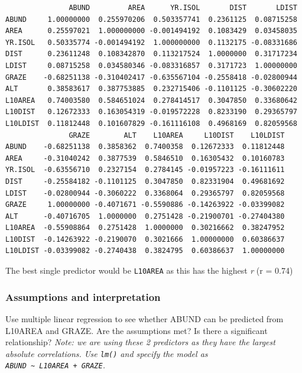 \documentclass[
  10pt,
  letterpaper,
  DIV=11,
  numbers=noendperiod]{scrartcl}
\begin{document}
\begin{verbatim}
               ABUND         AREA      YR.ISOL       DIST       LDIST
ABUND     1.00000000  0.255970206  0.503357741  0.2361125  0.08715258
AREA      0.25597021  1.000000000 -0.001494192  0.1083429  0.03458035
YR.ISOL   0.50335774 -0.001494192  1.000000000  0.1132175 -0.08331686
DIST      0.23611248  0.108342870  0.113217524  1.0000000  0.31717234
LDIST     0.08715258  0.034580346 -0.083316857  0.3171723  1.00000000
GRAZE    -0.68251138 -0.310402417 -0.635567104 -0.2558418 -0.02800944
ALT       0.38583617  0.387753885  0.232715406 -0.1101125 -0.30602220
L10AREA   0.74003580  0.584651024  0.278414517  0.3047850  0.33680642
L10DIST   0.12672333  0.163054319 -0.019572228  0.8233190  0.29365797
L10LDIST  0.11812448  0.101607829 -0.161116108  0.4968169  0.82059568
               GRAZE        ALT    L10AREA     L10DIST    L10LDIST
ABUND    -0.68251138  0.3858362  0.7400358  0.12672333  0.11812448
AREA     -0.31040242  0.3877539  0.5846510  0.16305432  0.10160783
YR.ISOL  -0.63556710  0.2327154  0.2784145 -0.01957223 -0.16111611
DIST     -0.25584182 -0.1101125  0.3047850  0.82331904  0.49681692
LDIST    -0.02800944 -0.3060222  0.3368064  0.29365797  0.82059568
GRAZE     1.00000000 -0.4071671 -0.5590886 -0.14263922 -0.03399082
ALT      -0.40716705  1.0000000  0.2751428 -0.21900701 -0.27404380
L10AREA  -0.55908864  0.2751428  1.0000000  0.30216662  0.38247952
L10DIST  -0.14263922 -0.2190070  0.3021666  1.00000000  0.60386637
L10LDIST -0.03399082 -0.2740438  0.3824795  0.60386637  1.00000000
\end{verbatim}

The best single predictor would be \texttt{L10AREA} as this has the
highest \emph{r} (r = 0.74)

\hypertarget{assumptions-and-interpretation}{%
\subsubsection{Assumptions and
interpretation}\label{assumptions-and-interpretation}}

\begin{tcolorbox}[enhanced jigsaw, rightrule=.15mm, coltitle=black, leftrule=.75mm, titlerule=0mm, breakable, toprule=.15mm, bottomtitle=1mm, colback=white, toptitle=1mm, opacitybacktitle=0.6, bottomrule=.15mm, arc=.35mm, left=2mm, title=\textcolor{quarto-callout-warning-color}{\faExclamationTriangle}\hspace{0.5em}{Question 2}, colbacktitle=quarto-callout-warning-color!10!white, opacityback=0, colframe=quarto-callout-warning-color-frame]

Use multiple linear regression to see whether ABUND can be predicted
from L10AREA and GRAZE. Are the assumptions met? Is there a significant
relationship? \emph{Note: we are using these 2 predictors as they have
the largest absolute correlations. Use \texttt{lm()} and specify the
model as \texttt{ABUND\ \textasciitilde{}\ L10AREA\ +\ GRAZE}.}

\end{tcolorbox}
\end{document}

